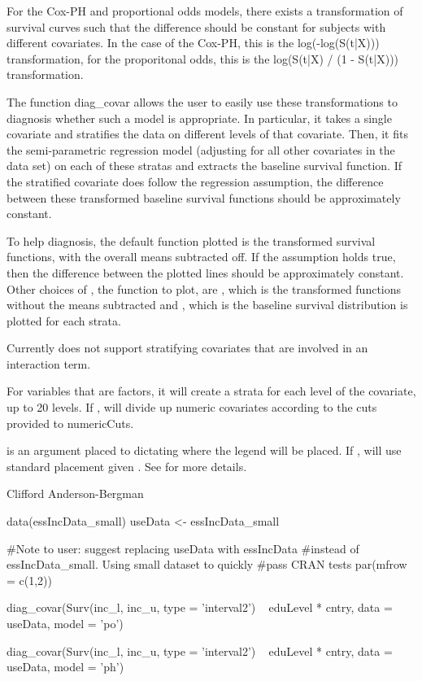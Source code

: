 \documentclass[a4paper]{book}
\begin{document}
\begin{Details}\relax
For the Cox-PH and proportional odds models, there exists a transformation of survival curves such that the difference should be constant for subjects with different covariates. In the case of the Cox-PH, this is the log(-log(S(t|X))) transformation, for the proporitonal odds, this is the log(S(t|X) / (1 - S(t|X))) transformation. 

The function diag\_covar allows the user to easily use these transformations to diagnosis whether such a model is appropriate. In particular, it takes a single covariate and stratifies the data on different levels of that covariate. Then, it fits the semi-parametric regression model (adjusting for all other covariates in the data set) on each of these stratas and extracts the baseline survival function. If the stratified covariate does follow the regression assumption, the difference between these transformed baseline survival functions should be approximately constant. 

To help diagnosis, the default function plotted is the transformed survival functions, with the overall means subtracted off. If the assumption holds true, then the difference between the plotted lines should be approximately constant. Other choices of , the function to plot, are , which is the transformed functions without the means subtracted and , which is the baseline survival distribution is plotted for each strata. 

Currently does not support stratifying covariates that are involved in an interaction term. 

For variables that are factors, it will create a strata for each level of the covariate, up to 20 levels. If , will divide up numeric covariates according to the cuts provided to numericCuts. 

 is an argument placed to  dictating where the legend will be placed. If , will use standard placement given . See  for more details. 
\end{Details}
%
\begin{Author}\relax
Clifford Anderson-Bergman
\end{Author}
%
\begin{Examples}
\begin{ExampleCode}
	 data(essIncData_small)
	 useData <- essIncData_small
	 
	 #Note to user: suggest replacing useData with essIncData
	 #instead of essIncData_small. Using small dataset to quickly 
	 #pass CRAN tests
	 par(mfrow = c(1,2))
	 	 
	 diag_covar(Surv(inc_l, inc_u, type = 'interval2') ~ eduLevel * cntry, 
		         data = useData, model = 'po')
		
	 diag_covar(Surv(inc_l, inc_u, type = 'interval2') ~ eduLevel * cntry, 
		         data = useData, model = 'ph')
\end{ExampleCode}
\end{Examples}
\end{document}
